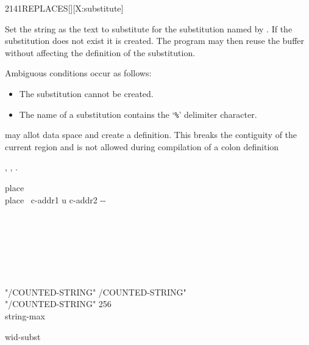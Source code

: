 \begin{worddef}{2141}{REPLACES}[][X:substitute]
\item {}

	Set the string  as the text to substitute for
	the substitution named by .
	If the substitution does not exist it is created.
	The program may then reuse the buffer  without
	affecting the definition of the substitution.

	Ambiguous conditions occur as follows:
	\begin{itemize}
	\item The substitution cannot be created.
	\item The name of a substitution contains the `\texttt{\%}' delimiter character.
	\end{itemize}

	 may allot data space and create a definition.  This breaks
	the contiguity of the current region and is not allowed during compilation
	of a colon definition
  
\see {},
	,
	.

	\begin{implement}

		\word[tools]{[UNDEFINED]} place \word[tools]{[IF]} \\
		\tab \word{:} place \tab {} \ c-addr1 u c-addr2 -{}- \\
		\tab {}  \\
		\tab {}  \\
		\tab[2]   \\
		  \word{+}   \\
		\tab[2]   \\
		\tab \word{;} \\
		\word[tools]{[THEN]}

		\word{:} "/COUNTED-STRING"  /COUNTED-STRING" \word{;} \\
		"/COUNTED-STRING"   \word[tools]{[IF]} 256 \word[tools]{[THEN]} \\
		  string-max

		  wid-subst \\
		 


\end{implement}
\end{worddef}
